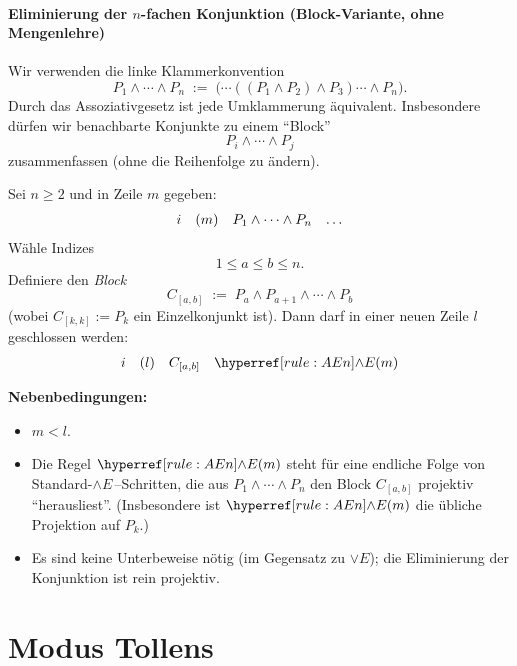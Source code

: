 \documentclass[main.tex]{subfiles}
\begin{document}
\subsubsection{Eliminierung der $n$-fachen Konjunktion (Block-Variante, ohne Mengenlehre)}
\label{rule:AEn}

\begin{remark}
Wir verwenden die linke Klammerkonvention
\[
P_1 \land \cdots \land P_n \;:=\; \bigl(\cdots((P_1 \land P_2)\land P_3)\cdots \land P_n\bigr).
\]
Durch das Assoziativgesetz ist jede Umklammerung äquivalent. Insbesondere dürfen wir benachbarte Konjunkte zu einem \enquote{Block}
\[
P_i \land \cdots \land P_j
\]
zusammenfassen (ohne die Reihenfolge zu ändern).
\end{remark}

\begin{definition}
Sei \(n \ge 2\) und in Zeile \(m\) gegeben:
\[
\begin{array}{l l l l}
  i & (m) & P_1 \land \cdots \land P_n & \dots
\end{array}
\]
Wähle Indizes
\[
1 \le a \le b \le n.
\]
Definiere den \emph{Block}
\[
C_{[a,b]} \;:=\; P_a \land P_{a+1} \land \cdots \land P_b
\]
(wobei \(C_{[k,k]} := P_k\) ein Einzelkonjunkt ist).
Dann darf in einer neuen Zeile \(l\) geschlossen werden:
\[
\begin{array}{l l l l}
  i & (l) & C_{[a,b]} & \rAEn{m}
\end{array}
\]

\textbf{Nebenbedingungen:}
\begin{itemize}
  \item \(m < l\).
  \item Die Regel \(\rAEn{m}\) steht für eine endliche Folge von Standard-\(\land E\)\,--Schritten,
        die aus \(P_1 \land \cdots \land P_n\) den Block \(C_{[a,b]}\) projektiv \enquote{herausliest}.
        (Insbesondere ist \(\rAEn{m}\) die übliche Projektion auf \(P_k\).)
  \item Es sind keine Unterbeweise nötig (im Gegensatz zu \(\lor E\)); die Eliminierung der Konjunktion ist rein projektiv.
\end{itemize}
\end{definition}



\chapter{Modus Tollens}

\begin{tabproof}
\end{tabproof}
\end{document}
